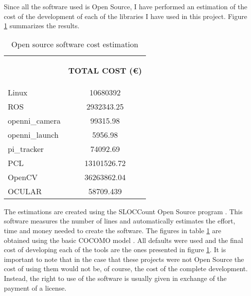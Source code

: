 		Since all the software used is Open Source, I have performed an estimation of the cost of the development of each of the libraries I have used in this project. 
		Figure \ref{estimations} summarizes the results.  






\begin{table}[H]
\centering
\begin{tabular} {l c}
\toprule
\addlinespace[3mm]
   \multicolumn{1}{c}{\begin{center}\textbf{SOFTWARE}\end{center}} &
   \multicolumn{1}{c}{\begin{center}\textbf{TOTAL COST (\euro)}\end{center}} &
\\
\addlinespace[-3mm]
\midrule
Linux	&	10680392	\\
ROS		&	2932343.25	\\
\hspace*{0.5cm}	openni\_camera	&	99315.98	\\
\hspace*{0.5cm}	openni\_launch	&	5956.98		\\
\hspace*{0.5cm}	pi\_tracker 	&	74092.69	\\
PCL	&	13101526.72		\\
OpenCV	&	36263862.04		\\
OCULAR	&	58709.439	\\

\bottomrule
\end{tabular}
\caption[Open source software cost estimation]{Open source software cost estimation}
\label{estimations}

\end{table}


		The estimations are created using the SLOCCount Open Source program \cite{sloccount}. 
		This software measures the number of lines and automatically estimates the effort, time and money needed to create the software. 
		The figures in table \ref{estimations} are obtained using the basic COCOMO model \cite{Boehm}. 
		All defaults were used and the final cost of developing each of the tools are the ones presented in figure \ref{estimations}. 
		It is important to note that in the case that these projects were not Open Source the cost of using them would not be, of course, the cost of the complete development. 
		Instead, the right to use of the software is usually given in exchange of the payment of a license. 
		\\

